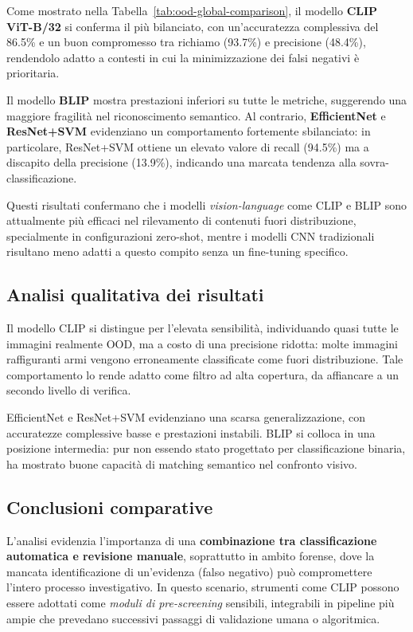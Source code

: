 Come mostrato nella Tabella~\ref{tab:ood-global-comparison}, il modello \textbf{CLIP ViT-B/32} si conferma il più bilanciato, con un’accuratezza complessiva del 86.5\% e un buon compromesso tra richiamo (93.7\%) e precisione (48.4\%), rendendolo adatto a contesti in cui la minimizzazione dei falsi negativi è prioritaria.

Il modello \textbf{BLIP} mostra prestazioni inferiori su tutte le metriche, suggerendo una maggiore fragilità nel riconoscimento semantico. Al contrario, \textbf{EfficientNet} e \textbf{ResNet+SVM} evidenziano un comportamento fortemente sbilanciato: in particolare, ResNet+SVM ottiene un elevato valore di recall (94.5\%) ma a discapito della precisione (13.9\%), indicando una marcata tendenza alla sovra-classificazione.

Questi risultati confermano che i modelli \textit{vision-language} come CLIP e BLIP sono attualmente più efficaci nel rilevamento di contenuti fuori distribuzione, specialmente in configurazioni zero-shot, mentre i modelli CNN tradizionali risultano meno adatti a questo compito senza un fine-tuning specifico.

\subsection{Analisi qualitativa dei risultati}

Il modello CLIP si distingue per l’elevata sensibilità, individuando quasi tutte le immagini realmente OOD, ma a costo di una precisione ridotta: molte immagini raffiguranti armi vengono erroneamente classificate come fuori distribuzione. Tale comportamento lo rende adatto come filtro ad alta copertura, da affiancare a un secondo livello di verifica.

EfficientNet e ResNet+SVM evidenziano una scarsa generalizzazione, con accuratezze complessive basse e prestazioni instabili. BLIP si colloca in una posizione intermedia: pur non essendo stato progettato per classificazione binaria, ha mostrato buone capacità di matching semantico nel confronto visivo.





\subsection{Conclusioni comparative}

L’analisi evidenzia l’importanza di una \textbf{combinazione tra classificazione automatica e revisione manuale}, soprattutto in ambito forense, dove la mancata identificazione di un’evidenza (falso negativo) può compromettere l’intero processo investigativo. In questo scenario, strumenti come CLIP possono essere adottati come \textit{moduli di pre-screening} sensibili, integrabili in pipeline più ampie che prevedano successivi passaggi di validazione umana o algoritmica.









